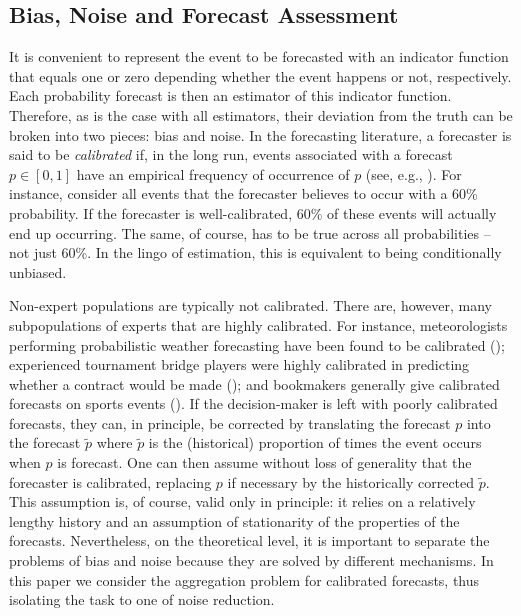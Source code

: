 \documentclass[11pt]{article}
\theoremstyle{definition}
\theoremstyle{definition}
\def\pt{\tilde{p}}
\begin{document}
\subsection{Bias, Noise and Forecast Assessment}
\label{BiasNoise}
It is convenient to represent the event to be forecasted with an
indicator function that equals one or zero depending whether the event
happens or not, respectively. Each probability forecast is then an
estimator of this indicator function.  Therefore, as is the case with
all estimators, their deviation from the truth can be broken into two
pieces: bias and noise.  In the forecasting literature, a forecaster
is said to be {\em calibrated} if, in the long run, events associated
with a forecast $p \in [0,1]$ have an empirical frequency of
occurrence of $p$ (see, e.g., \citealt{degroot1983comparison}). For
instance, consider all events that the forecaster believes to occur
with a 60\% probability. If the forecaster is well-calibrated, 60\% of
these events will actually end up occurring. The same, of course, has
to be true across all probabilities -- not just 60\%.  In the lingo of
estimation, this is equivalent to being conditionally unbiased.

Non-expert populations are typically not calibrated. There are,
however, many subpopulations of experts that are highly
calibrated. For instance, meteorologists performing probabilistic
weather forecasting have been found to be calibrated
(\citealt{murphy1977reliability}); experienced tournament bridge
players were highly calibrated in predicting whether a contract would
be made (\citealt{keren1987facing}); and bookmakers generally give
calibrated forecasts on sports events (\citealt{dowie1976efficiency,
yates1985conditional}). If the decision-maker is left with poorly
calibrated forecasts, they can, in principle, be corrected by
translating the forecast $p$ into the forecast $\pt$ where $\pt$ is
the (historical) proportion of times the event occurs when $p$ is
forecast.  One can then assume without loss of generality that the
forecaster is calibrated, replacing $p$ if necessary by the
historically corrected $\pt$. This assumption is, of course, valid
only in principle: it relies on a relatively lengthy history and an
assumption of stationarity of the properties of the forecasts.  
Nevertheless, on the
theoretical level, it is important to separate the problems of bias
and noise because they are solved by different mechanisms.  In this
paper we consider the aggregation problem for calibrated forecasts,
thus isolating the task to one of noise reduction.
\end{document}
